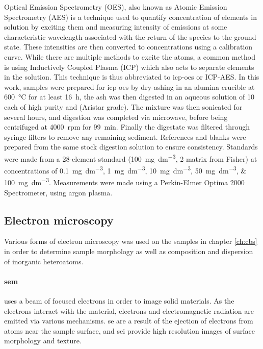 Optical Emission Spectrometry (OES), also known as Atomic Emission Spectrometry (AES) is a technique used to quantify concentration of elements in solution by exciting them and measuring intensity of emissions at some characteristic wavelength associated with the return of the species to the ground state. These intensities are then converted to concentrations using a calibration curve. While there are multiple methods to excite the atoms, a common method is using Inductively Coupled Plasma (ICP) which also acts to separate elements in the solution. This technique is thus abbreviated to \acrshort{icp-oes} or ICP-AES.\citep{Hinners1988interlaboratory} In this work, samples were prepared for \acrshort{icp-oes} by dry-ashing in an alumina crucible at \qty{600}{\degreeCelsius} for at least \qty{16}{\hour}, the ash was then digested in an aqueous solution of \qty{10}{\volpercent} each of high purity  and  (Aristar grade). The mixture was then sonicated for several hours, and digestion was completed via microwave, before being centrifuged at \qty{4000}{rpm} for \qty{99}{\minute}. Finally the digestate was filtered through syringe filters to remove any remaining sediment. References and blanks were prepared from the same stock digestion solution to ensure consistency. Standards were made from a 28-element standard (\qty{100}{\mg\per\dm\cubed}, \qty{2}{\volpercent}  matrix from Fisher) at concentrations of \qtylist[list-units = single]{0.1;1;10;50;100}{\mg\per\dm\cubed}. Measurements were made using a Perkin-Elmer Optima 2000 Spectrometer, using argon plasma.

\subsection{Electron microscopy}

Various forms of electron microscopy was used on the samples in chapter \ref{ch:cbs} in order to determine sample morphology as well as composition and dispersion of inorganic heteroatoms.

\paragraph{\acrfull{sem}} uses a beam of focused electrons in order to image solid materials. As the electrons interact with the material, electrons and electromagnetic radiation are emitted via various mechanisms. \Acrfull{se} are a result of the ejection of electrons from atoms near the sample surface, and \acrfull{sei} provide high resolution images of surface morphology and texture.\citep{Goldstein2017Scanning} 

